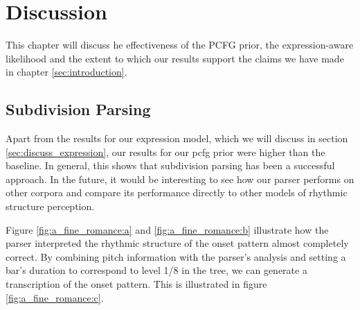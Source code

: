 \chapter{Discussion}
\label{sec:discussion}



This chapter will discuss he effectiveness of the PCFG prior, the expression-aware likelihood and the extent to which our results support the claims we have made in chapter \ref{sec:introduction}.

\section{Subdivision Parsing}

Apart from the results for our expression model, which we will discuss in section \ref{sec:discuss_expression}, our results for our pcfg prior were higher than the baseline. In general, this shows that subdivision parsing has been a successful approach. In the future, it would be interesting to see how our parser performs on other corpora and compare its performance directly to other models of rhythmic structure perception.

Figure \ref{fig:a_fine_romance:a} and \ref{fig:a_fine_romance:b} illustrate how the parser interpreted the rhythmic structure of the onset pattern almost completely correct. By combining pitch information with the parser's analysis and setting a bar's duration to correspond to level 1/8 in the tree, we can generate a transcription of the onset pattern. This is illustrated in figure \ref{fig:a_fine_romance:c}.

